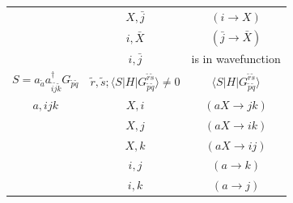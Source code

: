 \documentclass[./thesis.tex]{subfiles}
\begin{document}
\begin{table}
\begin{tabular}{ c|c|c }
		                                                                                                   & $X,\bar j$                                                                                   & $(i\rightarrow X)$                                              \\ 
		                                                                                                   & $i,\bar X$                                                                                   & $(\bar j\rightarrow \bar X)$                                    \\ 
		                                                                                                   & $i,\bar j$                                                                                   & is in wavefunction                                              \\ 
		\hline \hline
		$S = a_{\tilde a} a^\dagger_{\tilde i \tilde j \tilde k} G_{\tilde p \tilde q} $                   & $\tilde r, \tilde s ; \langle S|H|G_{\tilde p \tilde q}^{\tilde r \tilde s} \rangle \neq 0$  & $\langle S|H|G_{\tilde p \tilde q}^{\tilde r \tilde s} \rangle$ \\
		\hline \hline
		\rule{0pt}{3ex} $a,ijk$                                                                                            & $X,i$                                                                                        & $(aX\rightarrow jk)$                                            \\
		                                                                                                   & $X,j$                                                                                        & $(aX\rightarrow ik)$                                            \\
		                                                                                                   & $X,k$                                                                                        & $(aX\rightarrow ij)$                                            \\
		                                                                                                   & $i,j$                                                                                        & $(a\rightarrow k)$                                              \\
		                                                                                                   & $i,k$                                                                                        & $(a\rightarrow j)$                                              \\

\end{tabular}
\end{table}
\end{document}
